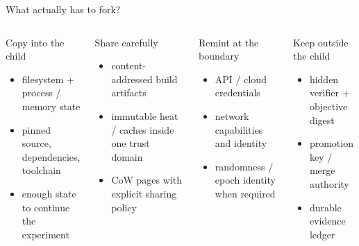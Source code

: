\begin{frame}{What actually has to fork?}
\small
\begin{columns}[T,onlytextwidth]
\begin{block}{Copy into the child}
\begin{itemize}
  \item filesystem + process / memory state
  \item pinned source, dependencies, toolchain
  \item enough state to continue the experiment
\end{itemize}
\end{block}
\begin{block}{Share carefully}
\begin{itemize}
  \item content-addressed build artifacts
  \item immutable heat / caches inside one trust domain
  \item CoW pages with explicit sharing policy
\end{itemize}
\end{block}
\begin{block}{Remint at the boundary}
\begin{itemize}
  \item API / cloud credentials
  \item network capabilities and identity
  \item randomness / epoch identity when required
\end{itemize}
\end{block}
\begin{block}{Keep outside the child}
\begin{itemize}
  \item hidden verifier + objective digest
  \item promotion key / merge authority
  \item durable evidence ledger
\end{itemize}
\end{block}
\end{columns}
\vspace{0.05em}
\centering\normalsize {}
\end{frame}

